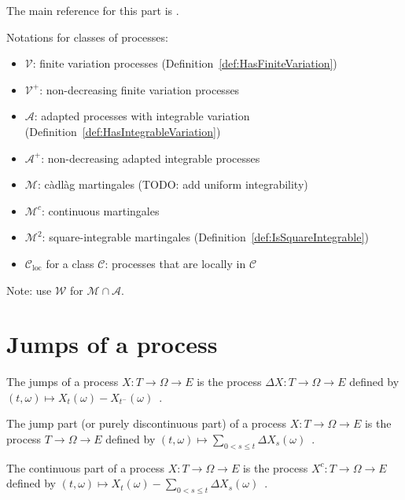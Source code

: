 The main reference for this part is \cite{he2019semimartingale}.

Notations for classes of processes:
\begin{itemize}
  \item $\mathcal{V}$: finite variation processes (Definition~\ref{def:HasFiniteVariation})
  \item $\mathcal{V}^+$: non-decreasing finite variation processes
  \item $\mathcal{A}$: adapted processes with integrable variation (Definition~\ref{def:HasIntegrableVariation})
  \item $\mathcal{A}^+$: non-decreasing adapted integrable processes
  \item $\mathcal{M}$: càdlàg martingales (TODO: \cite{he2019semimartingale} add uniform integrability)
  \item $\mathcal{M}^c$: continuous martingales
  \item $\mathcal{M}^2$: square-integrable martingales (Definition~\ref{def:IsSquareIntegrable})
  \item $\mathcal{C}_{\mathrm{loc}}$ for a class $\mathcal{C}$: processes that are locally in $\mathcal{C}$
\end{itemize}

Note: \cite{he2019semimartingale} use $\mathcal{W}$ for $\mathcal{M} \cap \mathcal{A}$.

\section{Jumps of a process}

\begin{definition}\label{def:jump}
  \leanok
The jumps of a process $X : T \to \Omega \to E$ is the process $\Delta X : T \to \Omega \to E$ defined by $(t, \omega) \mapsto X_t(\omega) - X_{t^-}(\omega)$~.
\end{definition}


\begin{definition}\label{def:jumpPart}
The jump part (or purely discontinuous part) of a process $X : T \to \Omega \to E$ is the process $T \to \Omega \to E$ defined by $(t, \omega) \mapsto \sum_{0 < s \le t} \Delta X_s(\omega)$~.
\end{definition}


\begin{definition}\label{def:continuousPart}
The continuous part of a process $X : T \to \Omega \to E$ is the process $X^c : T \to \Omega \to E$ defined by $(t, \omega) \mapsto X_t(\omega) - \sum_{0 < s \le t} \Delta X_s(\omega)$~.
\end{definition}


